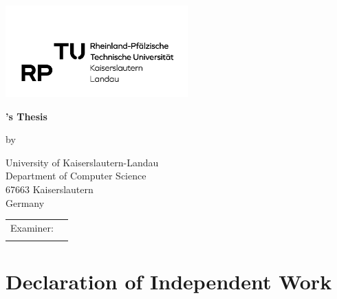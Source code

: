 \documentclass[
	bibliography=totoc, %
	listof=totoc,      %
]{scrbook}              %
\begin{document}
\frontmatter


\begin{titlepage}
	\makeatletter
	\centering
	\includegraphics[width=7cm]{RPTU-Logo-RGB} \par \vspace*{\fill}
	{\scshape\LARGE \@title \par} \vspace*{\fill}
	{\bfseries \thesisType's Thesis \par} \vspace{1cm}
	{by \par} \vspace{1cm}
	{\Large\itshape \@author \par} \vspace{1cm}
	{\@date \par} \vspace*{\fill}
	{University of Kaiserslautern-Landau\\
		Department of Computer Science\\
		67663 Kaiserslautern\\
		Germany \par} \vspace*{\fill}
	{
		\begin{tabular}{rl}
			Examiner: & \examinerA \\
			          & \examinerB
		\end{tabular}
	}
	\makeatother
\end{titlepage}
\restoregeometry



\clearpage
{}
\section*{Declaration of Independent Work}
\end{document}
